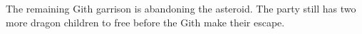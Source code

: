 The remaining Gith garrison is abandoning the asteroid.
The party still has two more dragon children to free before the Gith make their escape.

